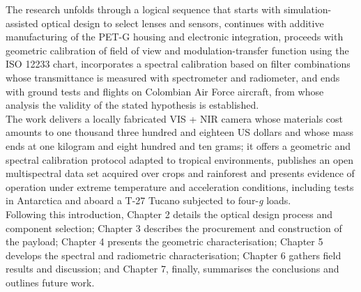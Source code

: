 \noindent The research unfolds through a logical sequence that starts with
simulation-assisted optical design to select lenses and sensors,
continues with additive manufacturing of the PET-G housing and
electronic integration, proceeds with geometric calibration of field of
view and modulation-transfer function using the ISO 12233 chart,
incorporates a spectral calibration based on filter combinations whose
transmittance is measured with spectrometer and radiometer, and ends
with ground tests and flights on Colombian Air Force aircraft, from
whose analysis the validity of the stated hypothesis is established.\\

\noindent The work delivers a locally fabricated VIS + NIR camera whose
materials cost amounts to one thousand three hundred and eighteen US
dollars and whose mass ends at one kilogram and eight hundred and ten
grams; it offers a geometric and spectral calibration protocol adapted
to tropical environments, publishes an open multispectral data set
acquired over crops and rainforest and presents evidence of operation
under extreme temperature and acceleration conditions, including tests
in Antarctica and aboard a T-27 Tucano subjected to four-\emph{g}
loads.\\

\noindent Following this introduction, Chapter 2 details the optical design
process and component selection; Chapter 3 describes the procurement and
construction of the payload; Chapter 4 presents the geometric
characterisation; Chapter 5 develops the spectral and radiometric
characterisation; Chapter 6 gathers field results and discussion; and
Chapter 7, finally, summarises the conclusions and outlines future
work.\\

